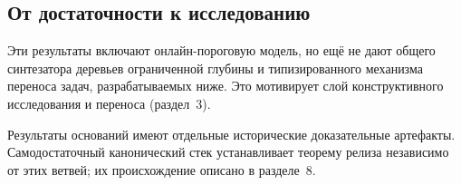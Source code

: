 \subsection{От достаточности к исследованию}
Эти результаты включают онлайн-пороговую модель, но ещё не дают общего синтезатора деревьев ограниченной глубины и типизированного механизма переноса задач, разрабатываемых ниже. Это мотивирует слой конструктивного исследования и переноса (раздел~3).

Результаты оснований имеют отдельные исторические доказательные артефакты. Самодостаточный канонический стек устанавливает теорему релиза независимо от этих ветвей; их происхождение описано в разделе~8.
